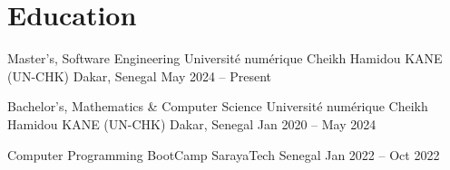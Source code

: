 \section{Education}

\resumeSubheading
    {Master's, Software Engineering}
    {Universit\'e num\'erique Cheikh Hamidou KANE (UN-CHK)}
    {Dakar, Senegal}
    {May 2024 -- Present}

\vspace{1pt}

\resumeSubheading
    {Bachelor's, Mathematics \& Computer Science}
    {Universit\'e num\'erique Cheikh Hamidou KANE (UN-CHK)}
    {Dakar, Senegal}
    {Jan 2020 -- May 2024}

\vspace{1pt}

\resumeSubheading
    {Computer Programming BootCamp}
    {SarayaTech}
    {Senegal}
    {Jan 2022 -- Oct 2022}

